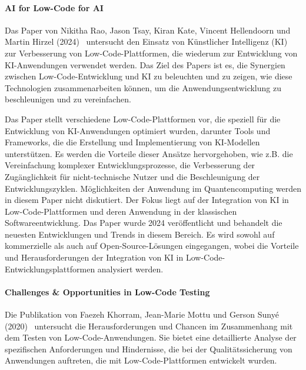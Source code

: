 \paragraph{AI for Low-Code for AI}

Das Paper von Nikitha Rao, Jason Tsay, Kiran Kate, Vincent Hellendoorn und Martin Hirzel (2024)~\cite{rao2024} untersucht den Einsatz 
von Künstlicher Intelligenz (KI) zur Verbesserung von Low-Code-Plattformen, die wiederum zur Entwicklung von KI-Anwendungen 
verwendet werden. Das Ziel des Papers ist es, die Synergien zwischen Low-Code-Entwicklung und KI zu beleuchten und zu 
zeigen, wie diese Technologien zusammenarbeiten können, um die Anwendungsentwicklung zu beschleunigen und zu vereinfachen.

Das Paper stellt verschiedene Low-Code-Plattformen vor, die speziell für die Entwicklung von KI-Anwendungen optimiert wurden, 
darunter Tools und Frameworks, die die Erstellung und Implementierung von KI-Modellen unterstützen. 
Es werden die Vorteile dieser Ansätze hervorgehoben, wie z.B. die Vereinfachung komplexer Entwicklungsprozesse, 
die Verbesserung der Zugänglichkeit für nicht-technische Nutzer und die Beschleunigung der Entwicklungszyklen. 
Möglichkeiten der Anwendung im Quantencomputing werden in diesem Paper nicht diskutiert. 
Der Fokus liegt auf der Integration von KI in Low-Code-Plattformen und deren Anwendung in der klassischen Softwareentwicklung. 
Das Paper wurde 2024 veröffentlicht und behandelt die neuesten Entwicklungen und Trends in diesem Bereich. 
Es wird sowohl auf kommerzielle als auch auf Open-Source-Lösungen eingegangen, wobei die 
Vorteile und Herausforderungen der Integration von KI in Low-Code-Entwicklungsplattformen analysiert werden.

\paragraph{Challenges \& Opportunities in Low-Code Testing}

Die Publikation von Faezeh Khorram, Jean-Marie Mottu und Gerson Sunyé (2020)~\cite{Khorram_2020} untersucht die Herausforderungen und Chancen 
im Zusammenhang mit dem Testen von Low-Code-Anwendungen. Sie bietet eine detaillierte Analyse der spezifischen Anforderungen 
und Hindernisse, die bei der Qualitätssicherung von Anwendungen auftreten, die mit Low-Code-Plattformen entwickelt wurden.

